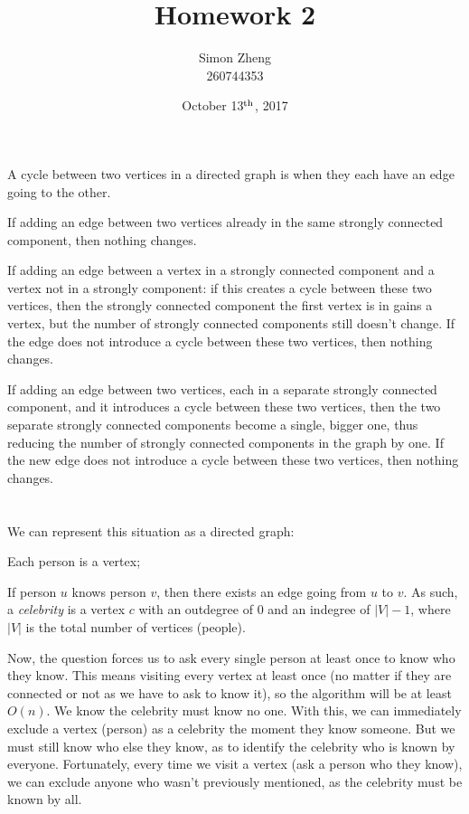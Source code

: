 \documentclass[11pt,letterpaper]{article}
\author{Simon Zheng\\260744353}
\title{Homework 2}
\date{October 13$^{\textnormal{th}}$, 2017}
\begin{document}
	\maketitle
	\thispagestyle{fancy}
	
	\section{}
	A cycle between two vertices in a directed graph is when they each have an edge going to the other.
	
	If adding an edge between two vertices already in the same strongly connected component, then nothing changes.
	
	If adding an edge between a vertex in a strongly connected component and a vertex not in a strongly component: if this creates a cycle between these two vertices, then the strongly connected component the first vertex is in gains a vertex, but the number of strongly connected components still doesn't change.
	If the edge does not introduce a cycle between these two vertices, then nothing changes.
	
	If adding an edge between two vertices, each in a separate strongly connected component, and it introduces a cycle between these two vertices, then the two separate strongly connected components become a single, bigger one, thus reducing the number of strongly connected components in the graph by one.
	If the new edge does not introduce a cycle between these two vertices, then nothing changes.
	
	\section{}
	We can represent this situation as a directed graph:
	
	Each person is a vertex;
	
	If person $u$ knows person $v$, then there exists an edge going from $u$ to $v$.\newline
	As such, a \textit{celebrity} is a vertex $c$ with an outdegree of $0$ and an indegree of $|V| - 1$, where $|V|$ is the total number of vertices (people).
	
	Now, the question forces us to ask every single person at least once to know who they know. This means visiting every vertex at least once (no matter if they are connected or not as we have to ask to know it), so the algorithm will be at least $O(n)$.
	We know the celebrity must know no one. With this, we can immediately exclude a vertex (person) as a celebrity the moment they know someone. But we must still know who else they know, as to identify the celebrity who is known by everyone.
	Fortunately, every time we visit a vertex (ask a person who they know), we can exclude anyone who wasn't previously mentioned, as the celebrity must be known by all.
	
\end{document}
